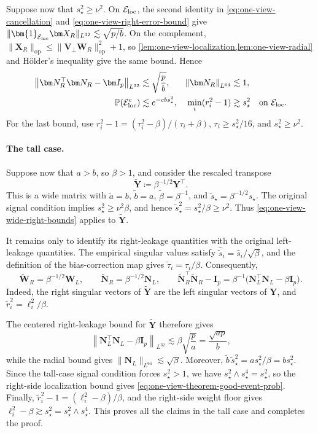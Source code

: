 \documentclass[11pt]{article}
\newcommand{\Pp}{\mathbb{P}}
\newcommand{\ind}{\bm{1}}
\newcommand{\trans}{\top}
\newcommand{\Lqn}[2]{\left\lVert #1\right\rVert_{L^{#2}}}
\newcommand{\cE}{\mathcal{E}}
\begin{document}
Suppose now that $s_\star^2\ge\nu^2$. On $\cE_{\rm loc}$, the second
identity in \cref{eq:one-view-cancellation} and
\cref{eq:one-view-right-error-bound} give
$\|\ind_{\cE_{\rm loc}}\bm X_R\|_{L^{32}}
\lesssim\sqrt{p/b}$.
On the complement,
$\|\bm X_R\|_{\mathrm{op}}
\le\|\bm V_\perp\bm W_R\|_{\mathrm{op}}^2+1$, so
\cref{lem:one-view-localization,lem:one-view-radial} and H\"older's
inequality give the same bound. Hence
\begin{align}
  \Lqn{\bm N_R^\trans\bm N_R-\bm I_p}{32}
  &\lesssim
  \sqrt{\frac pb},
  &
  \Lqn{\bm N_R}{64}
  &\lesssim
  1,
  \notag\\
  \Pp(\cE_{\rm loc}^c)
  &\lesssim
  e^{-cbs_\star^2},
  &
  \min_i(r_i^2-1)
  &\gtrsim
  s_\star^2
  \quad\text{on }\cE_{\rm loc}.
\label{eq:one-view-wide-right-bounds}
\end{align}
For the last bound, use
$r_i^2-1=(\tau_i^2-\beta)/(\tau_i+\beta)$,
$\tau_i\ge s_\star^2/16$, and $s_\star^2\ge\nu^2$.

\paragraph{The tall case.}
Suppose now that $a>b$, so $\beta>1$, and consider the rescaled transpose
\[
  \widetilde{\bm Y}
  \coloneqq
  \beta^{-1/2}\bm Y^\trans.
\]
This is a wide matrix with
$\widetilde a=b$, $\widetilde b=a$,
$\widetilde\beta=\beta^{-1}$, and
$\widetilde s_\star=\beta^{-1/2}s_\star$.
The original signal condition implies
$s_\star^2\ge\nu^2\beta$, and hence
$\widetilde s_\star^2=s_\star^2/\beta\ge\nu^2$.
Thus \cref{eq:one-view-wide-right-bounds} applies to
$\widetilde{\bm Y}$.

It remains only to identify its right-leakage quantities with the original
left-leakage quantities. The empirical singular values satisfy
$\widehat{\widetilde s}_i=\widehat s_i/\sqrt\beta$, and the definition of the bias-correction
map gives
$\widetilde\tau_i=\tau_i/\beta$. Consequently,
\begin{equation}
\label{eq:one-view-transpose-dictionary}
  \widetilde{\bm W}_R
  =
  \beta^{-1/2}\bm W_L,
  \qquad
  \widetilde{\bm N}_R
  =
  \beta^{-1/2}\bm N_L,
  \qquad
  \widetilde{\bm N}_R^\trans\widetilde{\bm N}_R-\bm I_p
  =
  \beta^{-1}
  \bigl(
    \bm N_L^\trans\bm N_L-\beta\bm I_p
  \bigr).
\end{equation}
Indeed, the right singular vectors of $\widetilde{\bm Y}$ are the left
singular vectors of $\bm Y$, and
$\widetilde r_i^2=\ell_i^2/\beta$.

The centered right-leakage bound for $\widetilde{\bm Y}$ therefore gives
\[
  \Lqn{
    \bm N_L^\trans\bm N_L-\beta\bm I_p
  }{32}
  \lesssim
  \beta\sqrt{\frac pa}
  =
  \frac{\sqrt{ap}}b,
\]
while the radial bound gives
$\|\bm N_L\|_{L^{64}}\lesssim\sqrt\beta$.
Moreover,
$\widetilde b\,\widetilde s_\star^2
=a s_\star^2/\beta=bs_\star^2$.
Since the tall-case signal condition forces $s_\star^2>1$, we have
$s_\star^2\wedge s_\star^4=s_\star^2$, so the right-side localization
bound gives \cref{eq:one-view-theorem-good-event-prob}.
Finally,
$\widetilde r_i^2-1=(\ell_i^2-\beta)/\beta$, and the right-side weight
floor gives
$\ell_i^2-\beta\gtrsim s_\star^2
=s_\star^2\wedge s_\star^4$.
This proves all the claims in the tall case and completes the proof.
\end{document}
